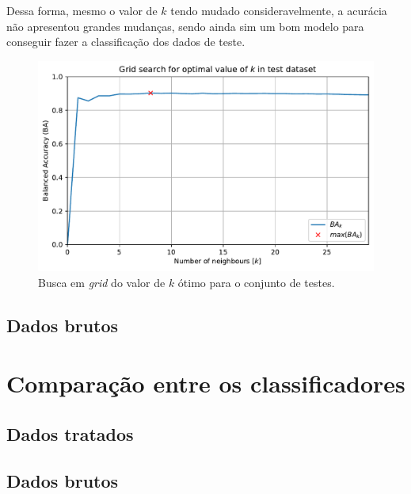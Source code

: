 Dessa forma, mesmo o valor de $k$ tendo mudado consideravelmente, a acurácia não apresentou grandes mudanças, sendo ainda sim um bom modelo para conseguir fazer a classificação dos dados de teste.

\begin{figure}[H]
	\centering
	\includegraphics[width=0.75\linewidth]{../../plot/knn_1/grid_search}
	\caption{Busca em \textit{grid} do valor de $k$ ótimo para o conjunto de testes.}
	\label{fig:gridsearchk}
\end{figure}

\subsection{Dados brutos}







\section{Comparação entre os classificadores}




\subsection{Dados tratados}





\subsection{Dados brutos}


